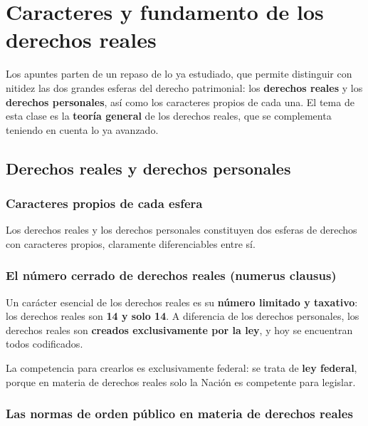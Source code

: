 \documentclass[12pt,oneside]{book}
\begin{document}
\tableofcontents
\clearpage

\chapter[Caracteres y fundamento de los derechos reales]{Caracteres y fundamento de los derechos reales}

Los apuntes parten de un repaso de lo ya estudiado, que permite distinguir con nitidez las dos grandes esferas del derecho patrimonial: los \textbf{derechos reales} y los \textbf{derechos personales}, así como los caracteres propios de cada una. El tema de esta clase es la \textbf{teoría general} de los derechos reales, que se complementa teniendo en cuenta lo ya avanzado.

\section{Derechos reales y derechos personales}

\subsection{Caracteres propios de cada esfera}

Los derechos reales y los derechos personales constituyen dos esferas de derechos con caracteres propios, claramente diferenciables entre sí.

\subsection{El número cerrado de derechos reales (numerus clausus)}

Un carácter esencial de los derechos reales es su \textbf{número limitado y taxativo}: los derechos reales son \textbf{14 y solo 14}. A diferencia de los derechos personales, los derechos reales son \textbf{creados exclusivamente por la ley}, y hoy se encuentran todos codificados.

La competencia para crearlos es exclusivamente federal: se trata de \textbf{ley federal}, porque en materia de derechos reales solo la Nación es competente para legislar.

\subsection{Las normas de orden público en materia de derechos reales}
\end{document}
